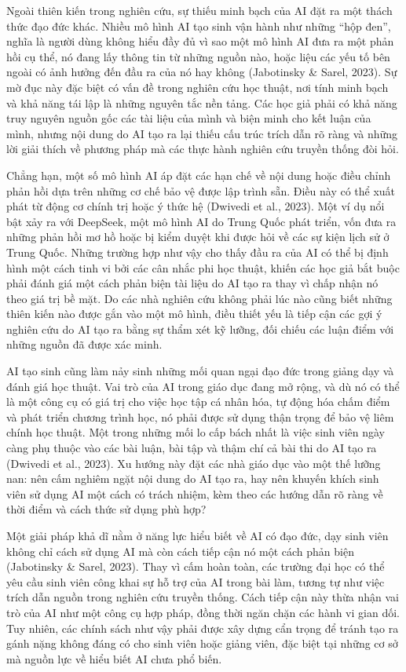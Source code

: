 Ngoài thiên kiến trong nghiên cứu, sự thiếu minh bạch của AI đặt ra một thách thức đạo đức khác. Nhiều mô hình AI tạo sinh vận hành như những ``hộp đen'', nghĩa là người dùng không hiểu đầy đủ vì sao một mô hình AI đưa ra một phản hồi cụ thể, nó đang lấy thông tin từ những nguồn nào, hoặc liệu các yếu tố bên ngoài có ảnh hưởng đến đầu ra của nó hay không (Jabotinsky \& Sarel, 2023). Sự mờ đục này đặc biệt có vấn đề trong nghiên cứu học thuật, nơi tính minh bạch và khả năng tái lập là những nguyên tắc nền tảng. Các học giả phải có khả năng truy nguyên nguồn gốc các tài liệu của mình và biện minh cho kết luận của mình, nhưng nội dung do AI tạo ra lại thiếu cấu trúc trích dẫn rõ ràng và những lời giải thích về phương pháp mà các thực hành nghiên cứu truyền thống đòi hỏi.

Chẳng hạn, một số mô hình AI áp đặt các hạn chế về nội dung hoặc điều chỉnh phản hồi dựa trên những cơ chế bảo vệ được lập trình sẵn. Điều này có thể xuất phát từ động cơ chính trị hoặc ý thức hệ (Dwivedi et al., 2023). Một ví dụ nổi bật xảy ra với DeepSeek, một mô hình AI do Trung Quốc phát triển, vốn đưa ra những phản hồi mơ hồ hoặc bị kiểm duyệt khi được hỏi về các sự kiện lịch sử ở Trung Quốc. Những trường hợp như vậy cho thấy đầu ra của AI có thể bị định hình một cách tinh vi bởi các cân nhắc phi học thuật, khiến các học giả bắt buộc phải đánh giá một cách phản biện tài liệu do AI tạo ra thay vì chấp nhận nó theo giá trị bề mặt. Do các nhà nghiên cứu không phải lúc nào cũng biết những thiên kiến nào được gắn vào một mô hình, điều thiết yếu là tiếp cận các gợi ý nghiên cứu do AI tạo ra bằng sự thẩm xét kỹ lưỡng, đối chiếu các luận điểm với những nguồn đã được xác minh.

AI tạo sinh cũng làm nảy sinh những mối quan ngại đạo đức trong giảng dạy và đánh giá học thuật. Vai trò của AI trong giáo dục đang mở rộng, và dù nó có thể là một công cụ có giá trị cho việc học tập cá nhân hóa, tự động hóa chấm điểm và phát triển chương trình học, nó phải được sử dụng thận trọng để bảo vệ liêm chính học thuật. Một trong những mối lo cấp bách nhất là việc sinh viên ngày càng phụ thuộc vào các bài luận, bài tập và thậm chí cả bài thi do AI tạo ra (Dwivedi et al., 2023). Xu hướng này đặt các nhà giáo dục vào một thế lưỡng nan: nên cấm nghiêm ngặt nội dung do AI tạo ra, hay nên khuyến khích sinh viên sử dụng AI một cách có trách nhiệm, kèm theo các hướng dẫn rõ ràng về thời điểm và cách thức sử dụng phù hợp?

Một giải pháp khả dĩ nằm ở năng lực hiểu biết về AI có đạo đức, dạy sinh viên không chỉ cách sử dụng AI mà còn cách tiếp cận nó một cách phản biện (Jabotinsky \& Sarel, 2023). Thay vì cấm hoàn toàn, các trường đại học có thể yêu cầu sinh viên công khai sự hỗ trợ của AI trong bài làm, tương tự như việc trích dẫn nguồn trong nghiên cứu truyền thống. Cách tiếp cận này thừa nhận vai trò của AI như một công cụ hợp pháp, đồng thời ngăn chặn các hành vi gian dối. Tuy nhiên, các chính sách như vậy phải được xây dựng cẩn trọng để tránh tạo ra gánh nặng không đáng có cho sinh viên hoặc giảng viên, đặc biệt tại những cơ sở mà nguồn lực về hiểu biết AI chưa phổ biến.

